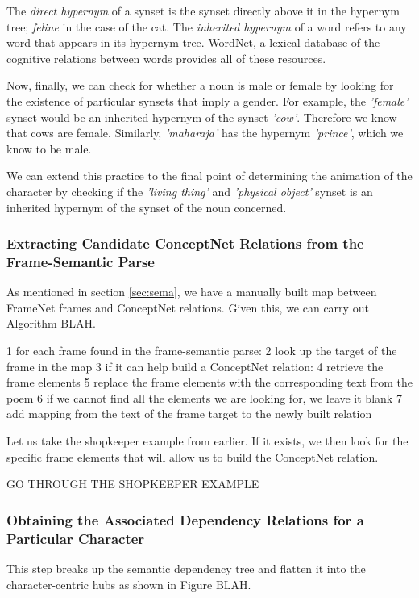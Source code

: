 The \textit{direct hypernym} of a synset is the synset directly above it in the hypernym tree; \textit{feline} in the case of the cat. The \textit{inherited hypernym} of a word refers to any word that appears in its hypernym tree. WordNet, a lexical database of the cognitive relations between words provides all of these resources.

Now, finally, we can check for whether a noun is male or female by looking for the existence of particular synsets that imply a gender. For example, the \textit{'female'} synset would be an inherited hypernym of the synset \textit{'cow'}. Therefore we know that cows are female. Similarly, \textit{'maharaja'} has the hypernym \textit{'prince'}, which we know to be male.

We can extend this practice to the final point of determining the animation of the character by checking if the \textit{'living thing'} and \textit{'physical object'} synset is an inherited hypernym of the synset of the noun concerned.


\subsubsection{Extracting Candidate ConceptNet Relations from the Frame-Semantic Parse}
\label{sec:candidate}

As mentioned in section \ref{sec:sema}, we have a manually built map between FrameNet frames and ConceptNet relations. Given this, we can carry out Algorithm BLAH.

1 for each frame found in the frame-semantic parse:
2	look up the target of the frame in the map
3	if it can help build a ConceptNet relation:	
4		retrieve the frame elements
5		replace the frame elements with the corresponding text from the poem
6			if we cannot find all the elements we are looking for, we leave it blank
7		add mapping from the text of the frame target to the newly built relation
	
Let us take the shopkeeper example from earlier. If it exists, we then look for the specific frame elements that will allow us to build the ConceptNet relation.

GO THROUGH THE SHOPKEEPER EXAMPLE

\subsubsection{Obtaining the Associated Dependency Relations for a Particular Character}

This step breaks up the semantic dependency tree and flatten it into the character-centric hubs as shown in Figure BLAH.

